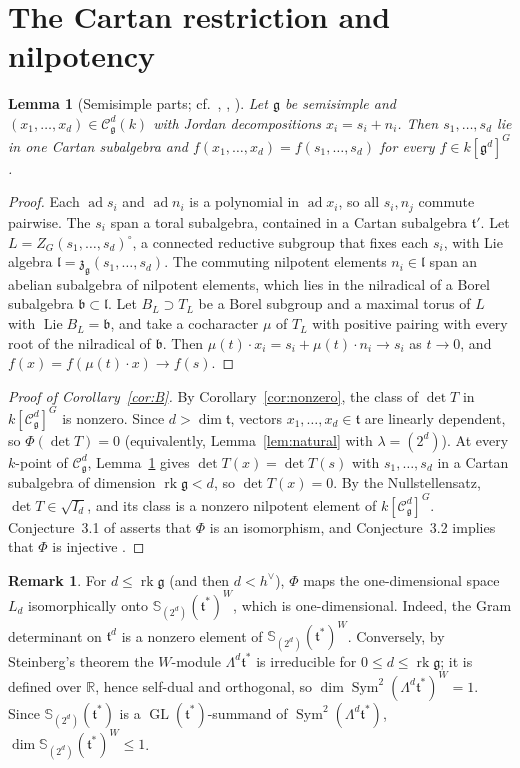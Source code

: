 \documentclass[11pt]{article}
\newtheorem{lemma}[theorem]{Lemma}
\theoremstyle{definition}
\newtheorem{remark}[theorem]{Remark}
\newcommand{\g}{\mathfrak g}
\newcommand{\h}{\mathfrak t}
\newcommand{\Cs}{\mathcal C}
\newcommand{\rk}{\operatorname{rk}}
\newcommand{\Sf}{\mathbb S}
\newcommand{\hv}{h^\vee}
\DeclareMathOperator{\Sym}{Sym}
\DeclareMathOperator{\GL}{GL}
\begin{document}
\section{The Cartan restriction and nilpotency}\label{sec:cartan}

\begin{lemma}[{Semisimple parts; cf.\ \cite{Ri88}, \cite[\S6]{Hu97}, \cite[\S3]{CN20}}]\label{lem:ss}
Let $\g$ be semisimple and $(x_1,\dots,x_d)\in\Cs^d_\g(k)$ with Jordan decompositions $x_i=s_i+n_i$. Then $s_1,\dots,s_d$ lie in one Cartan subalgebra and $f(x_1,\dots,x_d)=f(s_1,\dots,s_d)$ for every $f\in k[\g^d]^G$.
\end{lemma}
\begin{proof}
Each $\operatorname{ad}s_i$ and $\operatorname{ad}n_i$ is a polynomial in $\operatorname{ad}x_i$, so all $s_i,n_j$ commute pairwise. The $s_i$ span a toral subalgebra, contained in a Cartan subalgebra $\h'$. Let $L=Z_G(s_1,\dots,s_d)^\circ$, a connected reductive subgroup that fixes each $s_i$, with Lie algebra $\mathfrak l=\mathfrak z_\g(s_1,\dots,s_d)$. The commuting nilpotent elements $n_i\in\mathfrak l$ span an abelian subalgebra of nilpotent elements, which lies in the nilradical of a Borel subalgebra $\mathfrak b\subset\mathfrak l$. Let $B_L\supset T_L$ be a Borel subgroup and a maximal torus of $L$ with $\operatorname{Lie}B_L=\mathfrak b$, and take a cocharacter $\mu$ of $T_L$ with positive pairing with every root of the nilradical of $\mathfrak b$. Then $\mu(t)\cdot x_i=s_i+\mu(t)\cdot n_i\to s_i$ as $t\to0$, and $f(x)=f(\mu(t)\cdot x)\to f(s)$.
\end{proof}

\begin{proof}[Proof of Corollary~\ref{cor:B}]
By Corollary~\ref{cor:nonzero}, the class of $\det T$ in $k[\Cs^d_\g]^G$ is nonzero. Since $d>\dim\h$, vectors $x_1,\dots,x_d\in\h$ are linearly dependent, so $\Phi(\det T)=0$ (equivalently, Lemma~\ref{lem:natural} with $\lambda=(2^d)$). At every $k$-point of $\Cs^d_\g$, Lemma~\ref{lem:ss} gives $\det T(x)=\det T(s)$ with $s_1,\dots,s_d$ in a Cartan subalgebra of dimension $\rk\g<d$, so $\det T(x)=0$. By the Nullstellensatz, $\det T\in\sqrt{I_d}$, and its class is a nonzero nilpotent element of $k[\Cs^d_\g]^G$. Conjecture~3.1 of \cite{CN20} asserts that $\Phi$ is an isomorphism, and Conjecture~3.2 implies that $\Phi$ is injective \cite[\S3]{CN20}.
\end{proof}

\begin{remark}\label{rem:visible}
For $d\le\rk\g$ (and then $d<\hv$), $\Phi$ maps the one-dimensional space $L_d$ isomorphically onto $\Sf_{(2^d)}(\h^*)^W$, which is one-dimensional. Indeed, the Gram determinant on $\h^d$ is a nonzero element of $\Sf_{(2^d)}(\h^*)^W$. Conversely, by Steinberg's theorem \cite[Ch.~V, \S2, Exerc.~3]{Bou} the $W$-module $\Lambda^d\h^*$ is irreducible for $0\le d\le\rk\g$; it is defined over $\mathbb R$, hence self-dual and orthogonal, so $\dim\Sym^2(\Lambda^d\h^*)^W=1$. Since $\Sf_{(2^d)}(\h^*)$ is a $\GL(\h^*)$-summand of $\Sym^2(\Lambda^d\h^*)$, $\dim\Sf_{(2^d)}(\h^*)^W\le1$.
\end{remark}
\end{document}

